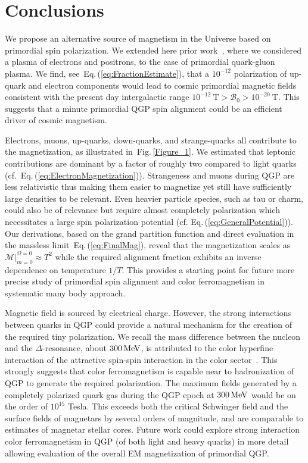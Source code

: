 \documentclass[epjST]{svjour}
\newcommand*{\MeV}{\text{\,MeV}}
\newcommand{\req}[1]{Eq.\,(\ref{#1})}
\newcommand{\rf}[1]{Fig.\,{\ref{#1}}}
\begin{document}
\section{Conclusions}
\label{sec:conclusions}
{\color{blue}We propose an alternative source of magnetism in the Universe based on primordial spin polarization. We extended here prior work~\cite{Steinmetz:2023nsc}, where we considered a plasma of electrons and positrons, to the case of primordial quark-gluon plasma. We find, see~\req{eq:FractionEstimate}, that a $10^{-12}$ polarization of up-quark and electron components would lead to cosmic primordial magnetic fields consistent with the present day intergalactic range \(10^{-12}~\mathrm{T} > \mathcal{B}_{0} > 10^{-20}~\mathrm{T}\). This suggests that a minute primordial QGP spin alignment could be an efficient driver of cosmic magnetism.

Electrons, muons, up-quarks, down-quarks, and strange-quarks all contribute to the magnetization, as illustrated in~\rf{Figure_1}. We estimated that leptonic contributions are dominant by a factor of roughly two compared to light quarks (cf.~\req{eq:ElectronMagnetization}). Strangeness and muons during QGP are less relativistic thus making them easier to magnetize yet still have sufficiently large densities to be relevant. Even heavier particle species, such as tau or charm, could also be of relevance but require  almost completely polarization which necessitates a large spin polarization potential (cf. \req{eq:GeneralPotential}). Our derivations, based on the grand partition function and direct evaluation  in the massless limit~\req{eq:FinalMag}, reveal that the magnetization scales as \(\mathcal{M}\vert_{m=0}^{\Omega=0} \approx T^{2}\) while the required alignment fraction exhibits an inverse dependence on temperature \(1/T\). This provides a starting point for future more precise study of primordial spin alignment and color ferromagnetism in systematic many body approach.

Magnetic field is sourced by electrical charge. However, the strong interactions between quarks in QGP could provide a natural mechanism for the creation of the required tiny polarization. We recall the mass difference between the nucleon and the \(\Delta\)-resonance, about \(300\MeV\), is attributed to the color hyperfine interaction of the attractive spin-spin interaction in the color sector~\cite{Johnson:1975zp,DeGrand:1975cf}. This strongly suggests that color ferromagnetism is capable near to hadronization of QGP to generate the required polarization. The maximum fields generated by a completely polarized quark gas during the QGP epoch at \(300\MeV\) would be on the order of \(10^{15}\) Tesla. This exceeds both the critical Schwinger field and the surface fields of magnetars by several orders of magnitude, and are comparable to estimates of magnetar stellar cores. Future work could explore strong interaction color ferromagnetism in QGP (of both light and heavy quarks) in more detail allowing evaluation of the overall EM magnetization of primordial QGP. 
}\\
\end{document}
